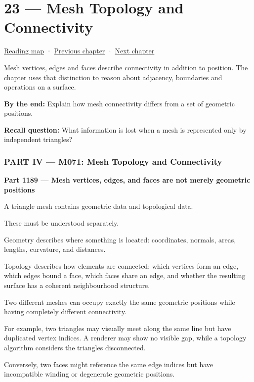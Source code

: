 \hypertarget{04-visual-computing-ii-ch023}{}
\chapter{23 --- Mesh Topology and Connectivity}\label{04-visual-computing-ii-ch023-mesh-topology-and-connectivity}

\hyperref[volume-reading-map]{Reading map} · \hyperref[04-visual-computing-ii-ch022-convex-support-mapping-and-distance]{Previous chapter} · \hyperref[04-visual-computing-ii-ch024-raytriangle-intersection]{Next chapter}

Mesh vertices, edges and faces describe connectivity in addition to position. The chapter uses that distinction to reason about adjacency, boundaries and operations on a surface.

\textbf{By the end:} Explain how mesh connectivity differs from a set of geometric positions.

\textbf{Recall question:} What information is lost when a mesh is represented only by independent triangles?

\subsection{PART IV --- M071: Mesh Topology and Connectivity}\label{04-visual-computing-ii-ch023-part-iv-m071-mesh-topology-and-connectivity}

\textbf{Part 1189 --- Mesh vertices, edges, and faces are not merely geometric positions}

A triangle mesh contains geometric data and topological data.

These must be understood separately.

Geometry describes where something is located: coordinates, normals, areas, lengths, curvature, and distances.

Topology describes how elements are connected: which vertices form an edge, which edges bound a face, which faces share an edge, and whether the resulting surface has a coherent neighbourhood structure.

Two different meshes can occupy exactly the same geometric positions while having completely different connectivity.

For example, two triangles may visually meet along the same line but have duplicated vertex indices. A renderer may show no visible gap, while a topology algorithm considers the triangles disconnected.

Conversely, two faces might reference the same edge indices but have incompatible winding or degenerate geometric positions.

